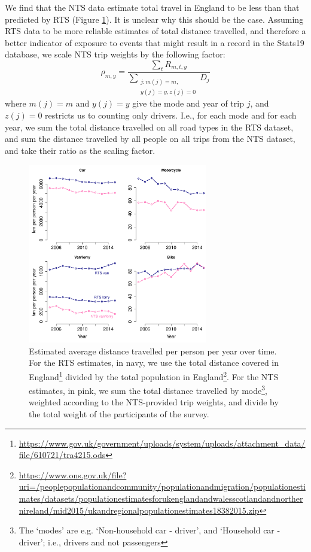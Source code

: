 \documentclass{article}
\begin{document}
We find that the NTS data estimate total travel in England to be less than that predicted by RTS (Figure \ref{total}). It is unclear why this should be the case. Assuming RTS data to be more reliable estimates of total distance travelled, and therefore a better indicator of exposure to events that might result in a record in the Stats19 database, we scale NTS trip weights by the following factor:
 $$\rho_{m,y}=\frac{\sum_{t}R_{m,t,y}}{\sum_{\substack{j:m(j)=m,\\
                  y(j)=y,z(j)=0}}D_{j}}$$ 
where $m(j)=m$ and $y(j)=y$ give the mode and year of trip $j$, and $z(j)=0$ restricts us to counting only drivers. I.e., for each mode and for each year, we sum the total distance travelled on all road types in the RTS dataset, and sum the distance travelled by all people on all trips from the NTS dataset, and take their ratio as the scaling factor.

\begin{figure}[H]
\centering
\includegraphics[width=0.7\textwidth]{NTSvsTRA.pdf}
\caption[Estimated average distance travelled per person per year over time.]{\small Estimated average distance travelled per person per year over time. For the RTS estimates, in navy, we use the total distance covered in England\footnote{\url{https://www.gov.uk/government/uploads/system/uploads/attachment_data/file/610721/tra4215.ods}} divided by the total population in England\footnote{\url{https://www.ons.gov.uk/file?uri=/peoplepopulationandcommunity/populationandmigration/populationestimates/datasets/populationestimatesforukenglandandwalesscotlandandnorthernireland/mid2015/ukandregionalpopulationestimates18382015.zip}}. For the NTS estimates, in pink, we sum the total distance travelled by mode\footnote{The `modes' are e.g. `Non-household car - driver', and `Household car - driver'; i.e., drivers and not passengers}, weighted according to the NTS-provided trip weights, and divide by the total weight of the participants of the survey.}
\label{total}
\end{figure}
\end{document}
